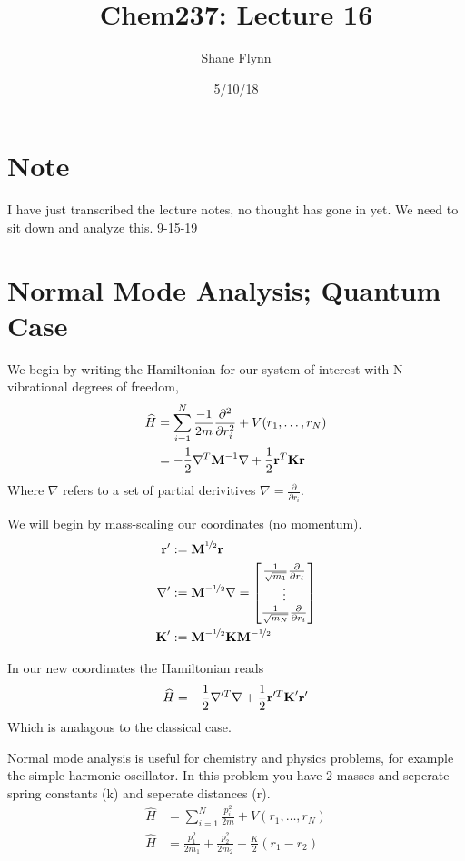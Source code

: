 \documentclass{article}
\title{Chem237: Lecture 16}
\date{5/10/18}
\author{Shane Flynn}
\newcommand{\be}{\begin{equation}}
\newcommand{\ee}{\end{equation}}
\newcommand{\pd}{\partial}
\newcommand{\half}{\frac{1}{2}}
\newcommand{\nhalf}{\nicefrac{1}{2}}
\newcommand{\pri}{\frac{\pd}{\pd r_i}}
\newcommand{\bM}{\mbox{\bf M}}
\newcommand{\bK}{\mbox{\bf K}}
\newcommand{\br}{\mbox{\bf r}}
\begin{document}
\maketitle

\section{Note}
I have just transcribed the lecture notes, no thought has gone in yet. We need to sit down and analyze this. 9-15-19

\section{Normal Mode Analysis; Quantum Case}
We begin by writing the Hamiltonian for our system of interest with N vibrational degrees of freedom,
\be
\begin{split}
    \widehat{H}&= \sum_{i = 1}^{N} \frac{-1}{2 m}  \frac{\pd^2}{\pd r_i^2}+ V(r_1,\dots,r_N)\\
    &=-\half \nabla^T\bM^{-1}\nabla + \half \br^T\bK\br
\end{split}
\ee
Where $\nabla$ refers to a set of partial derivitives $\nabla = \pri$. 


We will begin by mass-scaling our coordinates (no momentum). 
\be
\begin{split}
    \br' &:= \bM^{\nhalf}\br\\
    \nabla' &:= \bM^{-\nhalf}\nabla =  
    \begin{bmatrix} 
        \frac{1}{\sqrt{m_1}} \pri\\ 
        \vdots \\
        \frac{1}{\sqrt{m_N}} \pri
    \end{bmatrix}\\
    \bK' &:= \bM^{-\nhalf}\bK \bM^{-\nhalf}
\end{split}
\ee

In our new coordinates the Hamiltonian reads 
\be
    \widehat{H}= -\half\nabla'^T\nabla+\half\br'^T\bK'\br'
\ee
Which is analagous to the classical case. 

Normal mode analysis is useful for chemistry and physics problems, for example the simple harmonic oscillator.
In this problem you have 2 masses and seperate spring constants (k) and seperate distances (r). 
\be
\begin{split}
    \widehat{H} &= \sum_{i = 1}^{N} \frac{p^2_i}{2 m} + V(r_1, \dots, r_N)\\
    \widehat{H} &= \frac{p^2_1}{2 m_1} + \frac{p^2_2}{2 m_2} + \frac{K}{2}\left(r_1-r_2\right)
\end{split}
\ee
\end{document}
